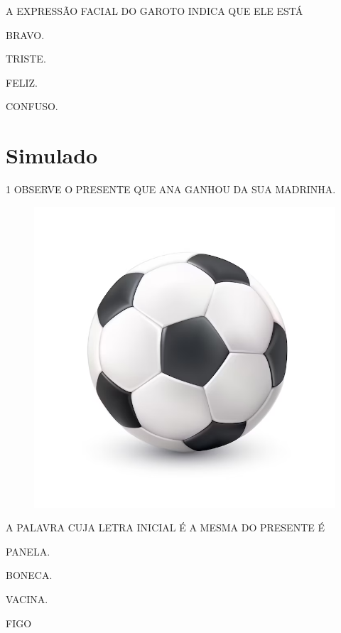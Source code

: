 A EXPRESSÃO FACIAL DO GAROTO INDICA QUE ELE ESTÁ

\begin{escolha}

\item BRAVO.

\item TRISTE.

\item FELIZ.

\item CONFUSO.

\end{escolha}

\chapter[Simulado 2]{Simulado}

\num{1} OBSERVE O PRESENTE QUE ANA GANHOU DA SUA MADRINHA.

\begin{figure}[H]
\centering
\includegraphics[width=\textwidth]{./media/image221.png}
\end{figure}

A PALAVRA CUJA LETRA INICIAL É A MESMA DO PRESENTE É

\begin{escolha}
\item PANELA.

\item BONECA.

\item VACINA.

\item FIGO

\end{escolha}

